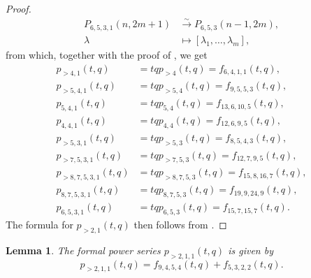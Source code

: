 \documentclass[a4paper, 12pt, reqno]{amsart}
\newtheorem{lemma}[theorem]{Lemma}
\theoremstyle{remark}
\numberwithin{equation}{subsection}
\begin{document}
\begin{proof}
  \begin{align*}
    P_{6, 5, 3, 1}(n, 2m + 1) &\xrightarrow{\sim} P_{6, 5, 3}(n - 1, 2m), \\
    \lambda &\mapsto [\lambda_1, \dots, \lambda_m],
  \end{align*}
  from which, together with the proof of , we get
  \begin{align*}
    p_{>4, 1}(t, q) &= tqp_{>4}(t, q) = f_{6, 4, 1, 1}(t, q), \\
    p_{>5, 4, 1}(t, q) &= tqp_{>5, 4}(t, q) = f_{9, 5, 5, 3}(t, q), \\
    p_{5, 4, 1}(t, q) &= tqp_{5, 4}(t, q) = f_{13, 6, 10, 5}(t, q), \\
    p_{4, 4, 1}(t, q) &= tqp_{4, 4}(t, q) = f_{12, 6, 9, 5}(t, q), \\
    p_{>5, 3, 1}(t, q) &= tqp_{>5, 3}(t, q) = f_{8, 5, 4, 3}(t, q), \\
    p_{>7, 5, 3, 1}(t, q) &= tqp_{>7, 5, 3}(t, q) = f_{12, 7, 9, 5}(t, q), \\
    p_{>8, 7, 5, 3, 1}(t, q) &= tqp_{>8, 7, 5, 3}(t, q) = f_{15, 8, 16, 7}(t, q), \\
    p_{8, 7, 5, 3, 1}(t, q) &= tqp_{8, 7, 5, 3}(t, q) = f_{19, 9, 24, 9}(t, q), \\
    p_{6, 5, 3, 1}(t, q) &= tqp_{6, 5, 3}(t, q) = f_{15, 7, 15, 7}(t, q).
  \end{align*}
  The formula for $p_{>2, 1}(t, q)$ then follows from .
\end{proof}

\begin{lemma}
  \label{lmm:38}
  The formal power series $p_{>2, 1, 1}(t, q)$ is given by
  \begin{equation*}
    p_{>2, 1, 1}(t, q) = f_{9, 4, 5, 4}(t, q) + f_{5, 3, 2, 2}(t, q).
  \end{equation*}
\end{lemma}
\end{document}
